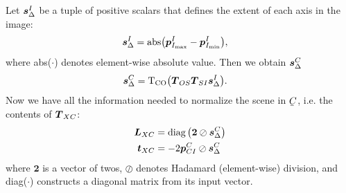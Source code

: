 Let ${\boldsymbol{s}_\Delta^I}$ be a tuple of positive scalars that defines the extent of each axis in the image:
%
\begin{align}\label{eq:M}
\dvec{s}_\Delta^I &= \mathrm{abs}\big(\dvec{p}_{I_\mathrm{max}}^I-\dvec{p}_{I_\mathrm{min}}^I\big),
\end{align}
%
where abs($\cdot$) denotes element-wise absolute value. Then we obtain $\boldsymbol{s}_\Delta^C$
\begin{align}\label{eq:M}
\dvec{s}_\Delta^C &= \mathrm{T_{CO}}\big(\mat{T}_{OS}\mat{T}_{SI}\dvec{s}_\Delta^I\big).
\end{align}
%
Now we have all the information needed to normalize the scene in $\ubar{C}$, i.e. the contents of $\boldsymbol{T}_{XC}$:
%
\begin{align}
\mat{L}_{XC}
&= \diag\left(\boldsymbol{2}\oslash\dvec{s}_\Delta^C\right) \label{eq_L_XC} \\
\dvec{t}_{XC}
&= -2\dvec{p}_{CI}^C\oslash\dvec{s}_\Delta^C \label{eq_t_XC}
\end{align}
%
where $\boldsymbol{2}$ is a vector of twos, $\oslash$ denotes Hadamard (element-wise) division, and diag($\cdot$) constructs a diagonal matrix from its input vector. 




%
%



